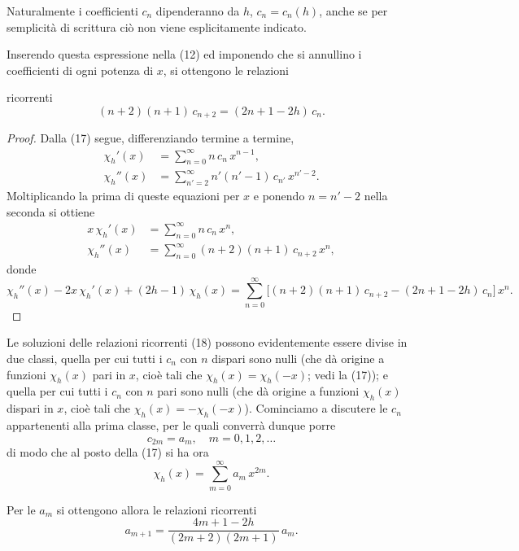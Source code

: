 \documentclass[11pt, a4paper]{book}
\numberwithin{equation}{section}
\begin{document}
Naturalmente i coefficienti $c_n$ dipenderanno da $h$, $c_n = c_n(h)$,
anche se per semplicità di scrittura ciò non viene esplicitamente
indicato.

Inserendo questa espressione nella (12) ed imponendo che si annullino
i coefficienti di ogni potenza di $x$, si ottengono le relazioni


ricorrenti
\begin{equation}
(n+2)(n+1)\,c_{n+2} = (2n+1-2h)\,c_n.
\end{equation}

\begin{proof}
Dalla (17) segue, differenziando termine a termine,
\begin{align*}
\chi_h'(x) &= \sum_{n=0}^{\infty} n\,c_n\,x^{n-1}, \\
\chi_h''(x) &= \sum_{n'=2}^{\infty} n'(n'-1)\,c_{n'}\,x^{n'-2}.
\end{align*}
Moltiplicando la prima di queste equazioni per $x$ e ponendo $n = n'-2$
nella seconda si ottiene
\begin{align*}
x\,\chi_h'(x) &= \sum_{n=0}^{\infty} n\,c_n\,x^n, \\
\chi_h''(x)   &= \sum_{n=0}^{\infty} (n+2)(n+1)\,c_{n+2}\,x^n,
\end{align*}
donde
\[
\chi_h''(x) - 2x\,\chi_h'(x) + (2h-1)\,\chi_h(x)
= \sum_{n=0}^{\infty}\bigl[(n+2)(n+1)\,c_{n+2} - (2n+1-2h)\,c_n\bigr]\,x^n.
\]
\end{proof}

Le soluzioni delle relazioni ricorrenti (18) possono evidentemente essere
divise in due classi, quella per cui tutti i $c_n$ con $n$ dispari sono
nulli (che dà origine a funzioni $\chi_h(x)$ pari in $x$, cioè tali che
$\chi_h(x) = \chi_h(-x)$; vedi la (17)); e quella per cui tutti i $c_n$
con $n$ pari sono nulli (che dà origine a funzioni $\chi_h(x)$ dispari in
$x$, cioè tali che $\chi_h(x) = -\chi_h(-x)$). Cominciamo a discutere
le $c_n$ appartenenti alla prima classe, per le quali converrà dunque
porre
\begin{equation}
c_{2m} = a_m, \quad m = 0, 1, 2, \ldots
\end{equation}
di modo che al posto della (17) si ha ora
\begin{equation}
\chi_h(x) = \sum_{m=0}^{\infty} a_m\,x^{2m}.
\end{equation}


Per le $a_m$ si ottengono allora le relazioni ricorrenti
\begin{equation}
a_{m+1} = \frac{4m+1-2h}{(2m+2)(2m+1)}\,a_m.
\end{equation}
\end{document}
